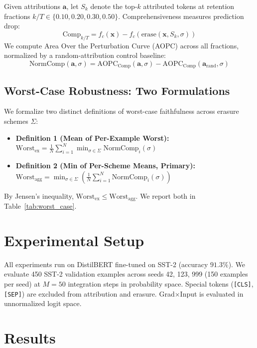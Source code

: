 \documentclass[11pt]{article}
\begin{document}
Given attributions $\mathbf{a}$, let $S_k$ denote the top-$k$ attributed tokens at retention fractions $k/T \in \{0.10, 0.20, 0.30, 0.50\}$. Comprehensiveness measures prediction drop:
\begin{equation}
\text{Comp}_{k/T} = f_c(\mathbf{x}) - f_c(\text{erase}(\mathbf{x}, S_k, \sigma))
\end{equation}
We compute Area Over the Perturbation Curve (AOPC) across all fractions, normalized by a random-attribution control baseline:
\begin{equation}
\text{NormComp}(\mathbf{a}, \sigma) = \text{AOPC}_{\text{Comp}}(\mathbf{a}, \sigma) - \text{AOPC}_{\text{Comp}}(\mathbf{a}_{\text{rand}}, \sigma)
\end{equation}

\subsection{Worst-Case Robustness: Two Formulations}
We formalize two distinct definitions of worst-case faithfulness across erasure schemes $\Sigma$:
\begin{itemize}
    \item \textbf{Definition 1 (Mean of Per-Example Worst):}
    $\text{Worst}_{\text{ex}} = \frac{1}{N} \sum_{i=1}^N \min_{\sigma \in \Sigma} \text{NormComp}_i(\sigma)$
    \item \textbf{Definition 2 (Min of Per-Scheme Means, Primary):}
    $\text{Worst}_{\text{agg}} = \min_{\sigma \in \Sigma} \left( \frac{1}{N} \sum_{i=1}^N \text{NormComp}_i(\sigma) \right)$
\end{itemize}
By Jensen's inequality, $\text{Worst}_{\text{ex}} \le \text{Worst}_{\text{agg}}$. We report both in Table~\ref{tab:worst_case}.

\section{Experimental Setup}
\label{sec:setup}
All experiments run on DistilBERT fine-tuned on SST-2 (accuracy $91.3\%$). We evaluate 450 SST-2 validation examples across seeds 42, 123, 999 (150 examples per seed) at $M=50$ integration steps in probability space. Special tokens (\texttt{[CLS]}, \texttt{[SEP]}) are excluded from attribution and erasure. Grad$\times$Input is evaluated in unnormalized logit space.

\section{Results}
\label{sec:results}
\end{document}
